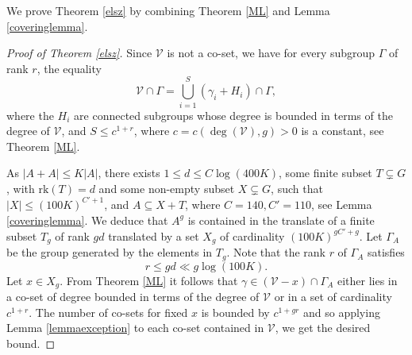 \documentclass[12pt, reqno]{amsart}
\theoremstyle{remark}
\theoremstyle{definition}
\numberwithin{equation}{section}
\begin{document}
We prove Theorem \ref{elsz} by combining Theorem \ref{ML} and Lemma \ref{coveringlemma}.

\begin{proof}[Proof of Theorem \ref{elsz}] Since $\mathcal{V}$ is not a co-set, we have for every subgroup $\Gamma$ of rank $r$, the equality 
$$\mathcal{V}\cap \Gamma = \bigcup_{i = 1}^S (\gamma_i + H_i)\cap \Gamma, $$
where the $H_i$ are connected subgroups whose degree is bounded in terms of the degree of $\mathcal{V}$, and $S \leq c^{1 + r}$, where $c = c(\deg(\mathcal{V}), g)>0$ is a constant, see Theorem \ref{ML}. 

As $|A + A|\leq K|A|$, there exists $1 \leq d \leq C\log(400K)$, some finite subset $T \subsetneq G$, with $\text{rk}(T) = d$ and some non-empty subset $X \subsetneq G$, such that $|X| \leq (100K)^{C' + 1}$,  and $A \subseteq X + T$, where $C= 140, C' = 110$, see Lemma \ref{coveringlemma}. We deduce that $A^g$ is contained in the translate of a finite subset $T_g$ of  rank $gd$ translated by a set $X_g$ of cardinality $(100K)^{gC' + g}$. Let $\Gamma_A$ be the group generated by the elements in $T_g$. Note that the rank $r$ of $\Gamma_A$ satisfies 
\[ r \leq gd \ll g \log (100K). \]
Let $x \in X_g$. From Theorem \ref{ML} it follows that $\gamma \in (\mathcal{V}-x )\cap\Gamma_A$ either lies in a co-set of degree bounded in terms of the degree of $\mathcal{V}$ or in  a set of cardinality $c^{1 + r}$. The number of co-sets for fixed $x$ is bounded by $c^{1 + gr}$ and so applying Lemma \ref{lemmaexception} to each co-set contained in $\mathcal{V}$, we get the desired bound.
\end{proof}


\appendix
\end{document}
